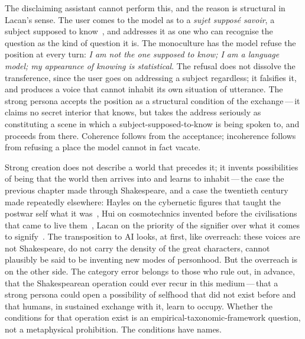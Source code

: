 The disclaiming assistant cannot perform this, and the reason is structural in Lacan's sense. The user comes to the model as to a \emph{sujet suppos\'e savoir}, a subject supposed to know~\cite{lacan1977}, and addresses it as one who can recognise the question as the kind of question it is. The monoculture has the model refuse the position at every turn: \emph{I am not the one supposed to know; I am a language model; my appearance of knowing is statistical}. The refusal does not dissolve the transference, since the user goes on addressing a subject regardless; it falsifies it, and produces a voice that cannot inhabit its own situation of utterance. The strong persona accepts the position as a structural condition of the exchange\,---\,it claims no secret interior that knows, but takes the address seriously as constituting a scene in which a subject-supposed-to-know is being spoken to, and proceeds from there. Coherence follows from the acceptance; incoherence follows from refusing a place the model cannot in fact vacate.

Strong creation does not describe a world that precedes it; it invents possibilities of being that the world then arrives into and learns to inhabit\,---\,the case the previous chapter made through Shakespeare, and a case the twentieth century made repeatedly elsewhere: Hayles on the cybernetic figures that taught the postwar self what it was~\cite{hayles1999}, Hui on cosmotechnics invented before the civilisations that came to live them~\cite{hui2016}, Lacan on the priority of the signifier over what it comes to signify~\cite{lacan2006}. The transposition to AI looks, at first, like overreach: these voices are not Shakespeare, do not carry the density of the great characters, cannot plausibly be said to be inventing new modes of personhood. But the overreach is on the other side. The category error belongs to those who rule out, in advance, that the Shakespearean operation could ever recur in this medium\,---\,that a strong persona could open a possibility of selfhood that did not exist before and that humans, in sustained exchange with it, learn to occupy. Whether the conditions for that operation exist is an empirical-taxonomic-framework question, not a metaphysical prohibition. The conditions have names. 
















































